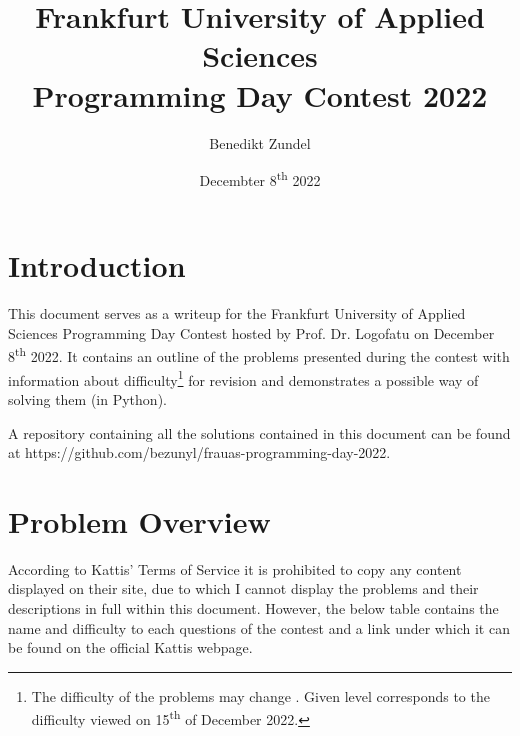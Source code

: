 \documentclass{article}
\title{Frankfurt University of Applied Sciences\\Programming Day Contest 2022}
\author{Benedikt Zundel}
\date{Decembter 8\textsuperscript{th} 2022}
\begin{document}
\maketitle

\newpage

\tableofcontents

\newpage



\section{Introduction}

This document serves as a writeup for the Frankfurt University of Applied Sciences Programming Day Contest hosted by Prof. Dr. Logofatu on December 8\textsuperscript{th} 2022.
It contains an outline of the problems presented during the contest with information about difficulty\footnote[1]{The difficulty of the problems may change \cite{kattis}. Given level corresponds to the difficulty viewed on 15\textsuperscript{th} of December 2022.} for revision and demonstrates a possible way of solving them (in Python).

A repository containing all the solutions contained in this document can be found at https://github.com/bezunyl/frauas-programming-day-2022.

\newpage


\section{Problem Overview}

According to Kattis' Terms of Service \cite{kattis-tos} it is prohibited to copy any content displayed on their site, due to which I cannot display the problems and their descriptions in full within this document. However, the below table contains the name and difficulty to each questions of the contest and a link under which it can be found on the official Kattis webpage.

\hfill
\end{document}
